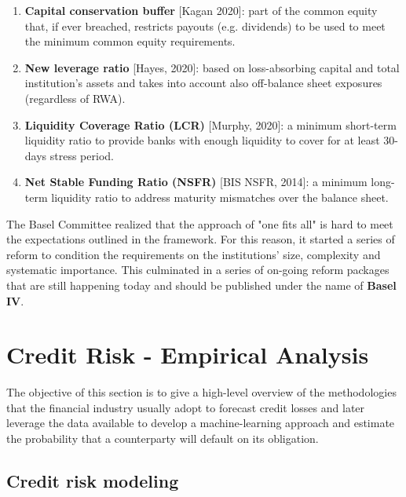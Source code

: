 \documentclass[a4paper,12pt]{article}
\begin{document}
        \begin{enumerate} 
            \item \textbf{Capital conservation buffer} [Kagan 2020]: part of the common equity that, if ever breached, restricts payouts (e.g. dividends) to be used to meet the minimum common equity requirements. 
            \item \textbf{New leverage ratio} [Hayes, 2020]: based on loss-absorbing capital and total institution's assets and takes into account also off-balance sheet exposures (regardless of RWA). 
            \item \textbf{Liquidity Coverage Ratio (LCR)} [Murphy, 2020]: a minimum short-term liquidity ratio to provide banks with enough liquidity to cover for at least 30-days stress period. 
            \item \textbf{Net Stable Funding Ratio (NSFR)} [BIS NSFR, 2014]: a minimum long-term liquidity ratio to address maturity mismatches over the balance sheet.
        \end{enumerate}

    The Basel Committee realized that the approach of "one fits all" 
    is hard to meet the expectations outlined in the framework. 
    For this reason, it started a series of reform to condition the 
    requirements on the institutions' size, complexity and systematic importance. 
    This culminated in a series of on-going reform packages that are still happening 
    today and should be published under the name of \textbf{Basel IV}.
    \newline

    
    \pagebreak
    \section{Credit Risk - Empirical Analysis}

    The objective of this section is to give a high-level overview of the methodologies 
    that the financial industry usually adopt to forecast credit losses and later leverage 
    the data available to develop a machine-learning approach and estimate the probability 
    that a counterparty will default on its obligation.

    \subsection[]{Credit risk modeling}
    
\end{document}
